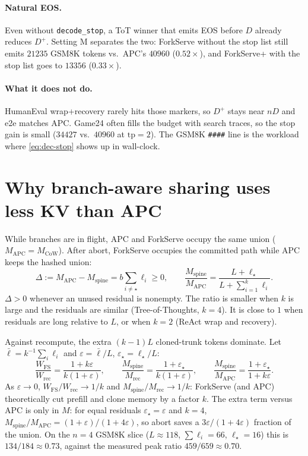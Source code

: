 \documentclass[11pt,a4paper]{article}
\begin{document}
\paragraph{Natural EOS.}
Even without \texttt{decode\_stop}, a ToT winner that emits EOS before $D$ already reduces $D^{+}$.
Setting M separates the two: ForkServe without the stop list still emits $21235$ GSM8K tokens vs.\ APC's $40960$ ($0.52\times$), and ForkServe+ with the stop list goes to $13356$ ($0.33\times$).

\paragraph{What it does not do.}
HumanEval wrap+recovery rarely hits those markers, so $D^{+}$ stays near $nD$ and e2e matches APC.
Game24 often fills the budget with search traces, so the stop gain is small ($34427$ vs.\ $40960$ at $\mathrm{tp}{=}2$).
The GSM8K \texttt{\#\#\#\#} line is the workload where \eqref{eq:dec-stop} shows up in wall-clock.

\section{Why branch-aware sharing uses less KV than APC}

While branches are in flight, APC and ForkServe occupy the same union ($M_{\mathrm{APC}}=M_{\mathrm{CoW}}$).
After abort, ForkServe occupies the committed path while APC keeps the hashed union:
\begin{equation}
\label{eq:gap}
\Delta
  := M_{\mathrm{APC}}-M_{\mathrm{spine}}
  = b\sum_{i\neq\star}\ell_i
  \ge 0,
\qquad
\frac{M_{\mathrm{spine}}}{M_{\mathrm{APC}}}
  = \frac{L+\ell_{\star}}{L+\sum_{i=1}^{k}\ell_i}.
\end{equation}
$\Delta>0$ whenever an unused residual is nonempty.
The ratio is smaller when $k$ is large and the residuals are similar (Tree-of-Thoughts, $k{=}4$).
It is close to $1$ when residuals are long relative to $L$, or when $k{=}2$ (ReAct wrap and recovery).

Against recompute, the extra $(k{-}1)L$ cloned-trunk tokens dominate.
Let $\bar\ell=k^{-1}\sum_i\ell_i$ and $\varepsilon=\bar\ell/L$, $\varepsilon_{\star}=\ell_{\star}/L$:
\begin{equation}
\label{eq:ratios}
\frac{W_{\mathrm{FS}}}{W_{\mathrm{rec}}}
  =\frac{1+k\varepsilon}{k(1+\varepsilon)},
\qquad
\frac{M_{\mathrm{spine}}}{M_{\mathrm{rec}}}
  =\frac{1+\varepsilon_{\star}}{k(1+\varepsilon)},
\qquad
\frac{M_{\mathrm{spine}}}{M_{\mathrm{APC}}}
  =\frac{1+\varepsilon_{\star}}{1+k\varepsilon}.
\end{equation}
As $\varepsilon\to 0$, $W_{\mathrm{FS}}/W_{\mathrm{rec}}\to 1/k$ and $M_{\mathrm{spine}}/M_{\mathrm{rec}}\to 1/k$: ForkServe (and APC) theoretically cut prefill and clone memory by a factor $k$.
The extra term versus APC is only in $M$: for equal residuals $\varepsilon_{\star}=\varepsilon$ and $k{=}4$,
$M_{\mathrm{spine}}/M_{\mathrm{APC}}=(1+\varepsilon)/(1+4\varepsilon)$,
so abort saves a $3\varepsilon/(1+4\varepsilon)$ fraction of the union.
On the $n{=}4$ GSM8K slice ($L{\approx}118$, $\sum\ell_i{=}66$, $\ell_{\star}{=}16$) this is $134/184\approx 0.73$, against the measured peak ratio $459/659\approx 0.70$.
\end{document}
